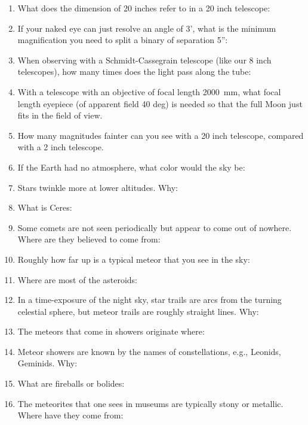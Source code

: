 \documentclass[11pt]{article}
\begin{document}
\begin{enumerate}
\item 
What does the dimension of 20 inches refer to in a 20 inch telescope:

\item 
If your naked eye can just resolve an angle of 3', what is the
minimum magnification you need to split a binary of separation 5'':


\item 
When observing with a Schmidt-Cassegrain telescope (like our 8 inch
telescopes), how many times does the light pass along the tube:

\item With a telescope with an objective of focal length 2000~mm, what
focal length eyepiece (of apparent field 40 deg) is needed so that the
full Moon just fits in the field of view.

\item 
How many magnitudes fainter can you see with a 20 inch telescope,
compared with a 2 inch telescope.

\item 
If the Earth had no atmosphere, what color would the sky be:

\item
Stars twinkle more at lower altitudes. Why:


\item 
What is Ceres:


\item 
Some comets are not seen periodically but appear to come out of 
nowhere. Where are they believed to come from:

\item 
Roughly how far up is a typical meteor that you see in the sky:

\item
Where are most of the asteroids:

\item 
In a time-exposure of the night sky, star trails are arcs from the
turning celestial sphere, but meteor
trails are roughly straight lines. Why:

\item
The meteors that come in showers originate where:

\item 
Meteor showers are known by the names of constellations, e.g.,
Leonids, Geminids.  Why:

\item 
What are fireballs or bolides:

\item 
The meteorites that one sees in museums are typically stony or
metallic. Where have they come from: 



\end{enumerate} 
\end{document}
